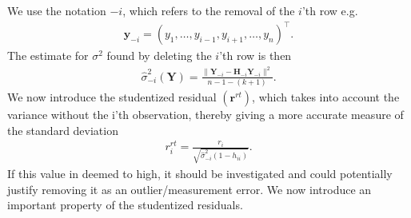 We use the notation $-i$, which refers to the removal of the $i$'th row e.g.
\begin{align*}
    \textbf{y}_{-i} = (y_1, \ldots, y_{i-1}, y_{i+1}, \ldots, y_n)^\top.
\end{align*}
The estimate for $\sigma^2$ found by deleting the $i$'th row is then
\begin{align*}
    \hat{\sigma}^2_{-i}(\textbf{Y}) = \frac{\| \textbf{Y}_{-i} - \textbf{H}_{-i} \textbf{Y}_{-i} \|^2}{n-1-(k+1)}.
\end{align*}
We now introduce the studentized residual $(\textbf{r}^{rt})$, which takes into account the variance without the i'th observation, thereby giving a more accurate measure of the standard deviation
\begin{align*}
    r_i^{rt} = \frac{r_i}{\sqrt{\hat{\sigma}^2_{-i}(1-h_{ii})}}.
\end{align*}
If this value in deemed to high, it should be investigated and could potentially justify removing it as an outlier/measurement error. We now introduce an important property of the studentized residuals.

